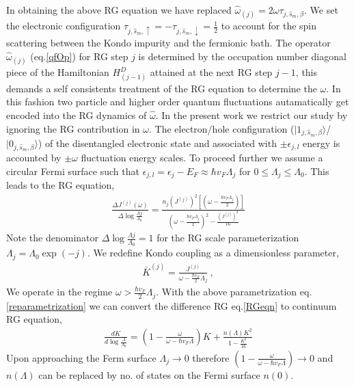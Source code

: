 \documentclass[aps,prl,preprint,groupedaddress]{revtex4-2}
\begin{document}
In obtaining the above RG equation we have replaced  $\hat{\omega}_{(j)}=2\omega\tau_{j,\hat{s}_{m},\beta}$. We set the electronic configuration $\tau_{j,\hat{s}_{m},\uparrow}=-\tau_{j,\hat{s}_{m},\downarrow}=\frac{1}{2}$ to account for the spin scattering between the Kondo impurity and the fermionic bath.  The operator $\hat{\omega}_{(j)}$ (eq.\eqref{qfOp}) for RG step $j$ is determined by the occupation number diagonal piece of the Hamiltonian  $H^{D}_{(j-1)}$ attained at the next RG step $j-1$, this demands a self consistents treatment of the RG equation to determine the $\omega$. In this fashion two particle and higher order quantum fluctuations autamatically get  encoded into the RG dynamics of $\hat{\omega}$. In the present work we restrict our study by ignoring the RG contribution in $\omega$. The electron/hole configuration ($|1_{j,\hat{s}_{m},\beta}\rangle$/$|0_{j,\hat{s}_{m},\beta}\rangle$)  of the disentangled electronic state and associated with $\pm \epsilon_{j,l}$ energy is accounted by $\pm\omega$ fluctuation energy scales. To proceed further we assume a circular Fermi surface such that $\epsilon_{j,l}=\epsilon_{j}-E_{F}\approx\hbar v_{F}\Lambda_{j}$ for $0\leq\Lambda_{j}\leq\Lambda_{0}$. This leads to the RG equation,
\begin{eqnarray}
\frac{\Delta J^{(j)}(\omega)}{\Delta\log\frac{\Lambda{j}}{\Lambda_{0}}}=\frac{n_{j}(J^{(j)})^{2}\left[(\omega - \frac{\hbar v_{F}\Lambda_{j}}{2})\right]}{(\omega - \frac{\hbar v_{F}\Lambda_{j}}{2})^{2}-\frac{\left(J^{(j)}\right)^{2}}{16}}\label{RGeqn}
\end{eqnarray}
Note the denominator $\Delta\log\frac{\Lambda{j}}{\Lambda_{0}} =1$ for the RG scale parameterization $\Lambda_{j}=\Lambda_{0}\exp(-j)$. We redefine Kondo coupling as a dimensionless parameter,
\begin{eqnarray}
\bar{K}^{(j)}=\frac{J^{(j)}}{\omega-\frac{\hbar v_{F}}{2}\Lambda_{j}}~,\label{reparametrization}
\end{eqnarray} 
We operate in the regime $\omega>\frac{\hbar v_{F}}{2}\Lambda_{j}$. 
With the above parametrization eq.\eqref{reparametrization} we can convert the difference RG eq.\eqref{RGeqn} to continuum RG equation,
\begin{eqnarray}
\frac{d K}{d\log\frac{\Lambda}{\Lambda_{0}}}=\left(1-\frac{\omega}{\omega-\hbar v_{F}\Lambda}\right)K+\frac{n(\Lambda)K^{2}}{1-\frac{K^{2}}{16}}
\end{eqnarray}
Upon approaching the Ferm surface $\Lambda_{j}\to 0$ therefore $\left(1-\frac{\omega}{\omega-\hbar v_{F}\Lambda}\right)\to 0$ and $n(\Lambda)$ can be replaced by no. of states on the Fermi surface $n(0)$.
\end{document}
